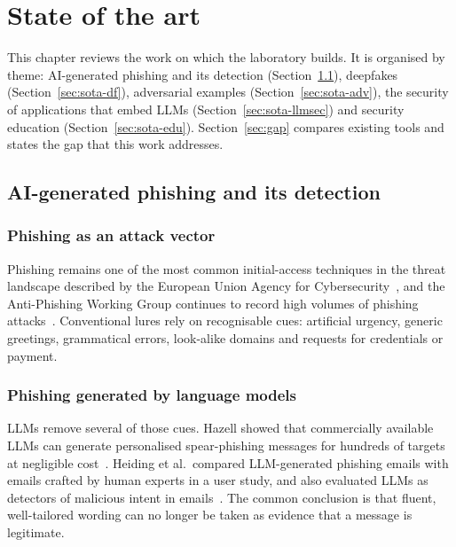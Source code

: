 \chapter{State of the art}
\label{cha:sota}

This chapter reviews the work on which the laboratory builds. It is organised by theme: AI-generated phishing and its detection (Section~\ref{sec:sota-phish}), deepfakes (Section~\ref{sec:sota-df}), adversarial examples (Section~\ref{sec:sota-adv}), the security of applications that embed LLMs (Section~\ref{sec:sota-llmsec}) and security education (Section~\ref{sec:sota-edu}). Section~\ref{sec:gap} compares existing tools and states the gap that this work addresses.

\section{AI-generated phishing and its detection}
\label{sec:sota-phish}

\subsection{Phishing as an attack vector}
Phishing remains one of the most common initial-access techniques in the threat landscape described by the European Union Agency for Cybersecurity~\cite{enisa2024threat}, and the Anti-Phishing Working Group continues to record high volumes of phishing attacks~\cite{apwg2024}. Conventional lures rely on recognisable cues: artificial urgency, generic greetings, grammatical errors, look-alike domains and requests for credentials or payment.

\subsection{Phishing generated by language models}
LLMs remove several of those cues. Hazell showed that commercially available LLMs can generate personalised spear-phishing messages for hundreds of targets at negligible cost~\cite{hazell2023spear}. Heiding et al.\ compared LLM-generated phishing emails with emails crafted by human experts in a user study, and also evaluated LLMs as detectors of malicious intent in emails~\cite{heiding2024devising}. The common conclusion is that fluent, well-tailored wording can no longer be taken as evidence that a message is legitimate.

